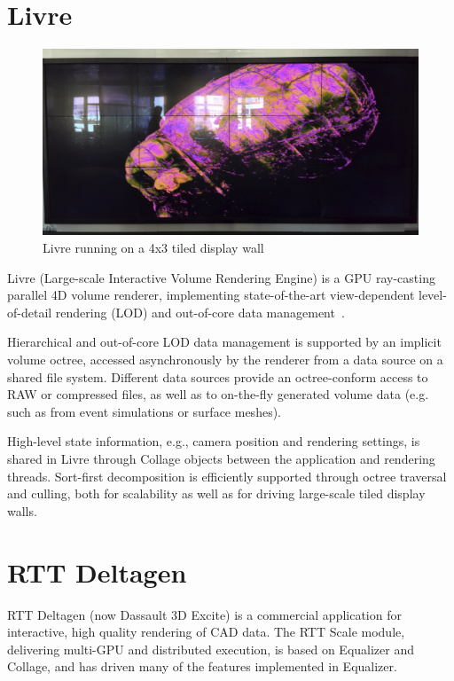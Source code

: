 \section{Livre}

\begin{figure}
  \includegraphics[width=.618\textwidth]{images/livre}
  {\caption{\label{fLivre}Livre running on a 4x3 tiled display wall}}
\end{figure}

Livre (Large-scale Interactive Volume Rendering Engine) is a GPU ray-casting
parallel 4D volume renderer, implementing state-of-the-art view-dependent
level-of-detail rendering (LOD) and out-of-core data
management~\cite{EHKRW:06}.

Hierarchical and out-of-core LOD data management is supported by an implicit
volume octree, accessed asynchronously by the renderer from a data source on a
shared file system. Different data sources provide an octree-conform access to
RAW or compressed files, as well as to on-the-fly generated volume data (e.g.
such as from event simulations or surface meshes).

High-level state information, e.g., camera position and rendering settings, is
shared in Livre through \textsf{Collage} objects between the application and
rendering threads. Sort-first decomposition is efficiently supported through
octree traversal and culling, both for scalability as well as for driving
large-scale tiled display walls.

\section{RTT Deltagen}

RTT Deltagen (now Dassault 3D Excite) is a commercial application for
interactive, high quality rendering of CAD data. The RTT Scale module,
delivering multi-GPU and distributed execution, is based on \textsf{Equalizer}
and \textsf{Collage}, and has driven many of the features implemented in
Equalizer.

